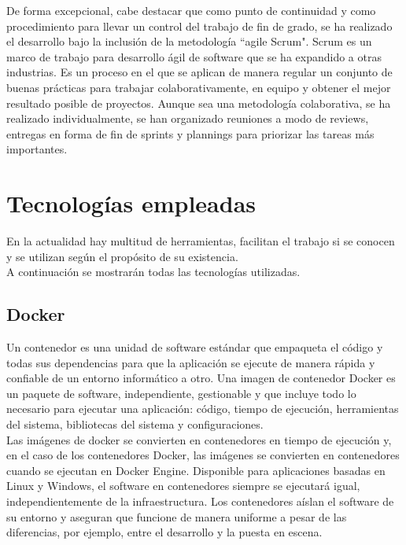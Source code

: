 \documentclass[ spanish, a4paper, 12pt, oneside]{report}
\begin{document}
De forma excepcional, cabe destacar que como punto de continuidad y como procedimiento para llevar un control del trabajo de fin de grado, se ha realizado el desarrollo bajo la inclusión de la 
metodología ``agile Scrum". Scrum es un marco de trabajo para desarrollo ágil de software que se ha expandido a otras industrias. Es un proceso en el que se aplican de manera regular un conjunto 
de buenas prácticas para trabajar colaborativamente, en equipo y obtener el mejor resultado posible de proyectos. Aunque sea una metodología colaborativa, se ha realizado individualmente, se han organizado 
reuniones a modo de reviews, entregas en forma de fin de sprints y plannings para priorizar las tareas más importantes.\\

\section{Tecnologías empleadas}
En la actualidad hay multitud de herramientas, facilitan el trabajo si se conocen y se utilizan según el propósito de su existencia. \\

A continuación se mostrarán todas las tecnologías utilizadas.\\

\subsection{Docker}
Un contenedor es una unidad de software estándar que empaqueta el código y todas sus dependencias para que la aplicación 
se ejecute de manera rápida y confiable de un entorno informático a otro. Una imagen de contenedor Docker es un paquete 
de software, independiente, gestionable y que incluye todo lo necesario para ejecutar una aplicación: código, tiempo 
de ejecución, herramientas del sistema, bibliotecas del sistema y configuraciones.\\

Las imágenes de docker se convierten en contenedores en tiempo de ejecución y, en el caso de los contenedores Docker, 
las imágenes se convierten en contenedores cuando se ejecutan en Docker Engine. Disponible para aplicaciones basadas en 
Linux y Windows, el software en contenedores siempre se ejecutará igual, independientemente de la infraestructura. Los 
contenedores aíslan el software de su entorno y aseguran que funcione de manera uniforme a pesar de las diferencias, por 
ejemplo, entre el desarrollo y la puesta en escena.\\
\end{document}

